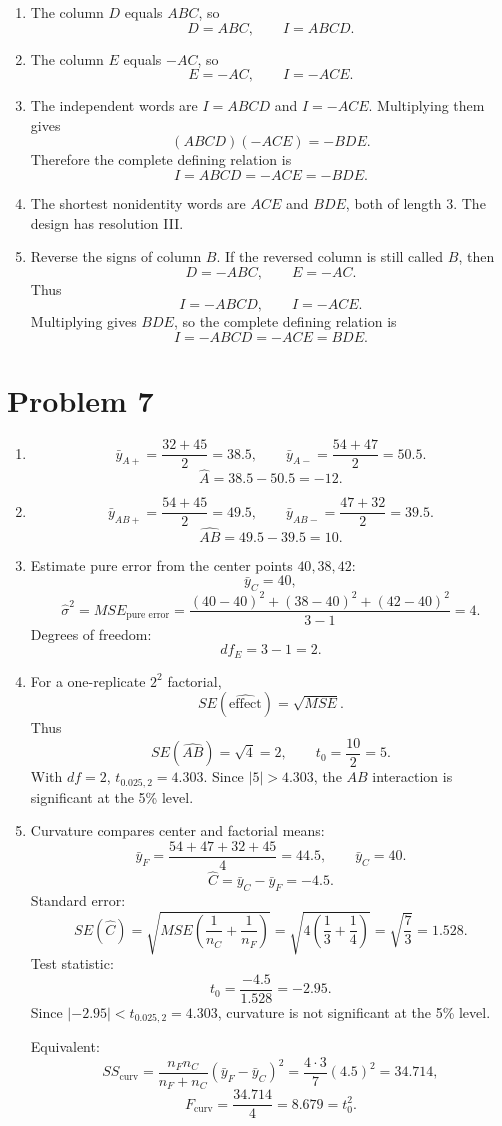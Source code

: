 \documentclass[11pt]{article}
\begin{document}
\begin{enumerate}[label=(\alph*)]
\item The column \(D\) equals \(ABC\), so
\[
D=ABC,\qquad I=ABCD.
\]

\item The column \(E\) equals \(-AC\), so
\[
E=-AC,\qquad I=-ACE.
\]

\item The independent words are \(I=ABCD\) and \(I=-ACE\). Multiplying them gives
\[
(ABCD)(-ACE)=-BDE.
\]
Therefore the complete defining relation is
\[
I=ABCD=-ACE=-BDE.
\]

\item The shortest nonidentity words are \(ACE\) and \(BDE\), both of length 3. The design has resolution III.

\item Reverse the signs of column \(B\). If the reversed column is still called \(B\), then
\[
D=-ABC,\qquad E=-AC.
\]
Thus
\[
I=-ABCD,\qquad I=-ACE.
\]
Multiplying gives \(BDE\), so the complete defining relation is
\[
I=-ABCD=-ACE=BDE.
\]
\end{enumerate}

\section*{Problem 7}

\begin{enumerate}[label=(\alph*)]
\item
\[
\bar y_{A+}=\frac{32+45}{2}=38.5,\qquad
\bar y_{A-}=\frac{54+47}{2}=50.5.
\]
\[
\hat A=38.5-50.5=-12.
\]

\item
\[
\bar y_{AB+}=\frac{54+45}{2}=49.5,\qquad
\bar y_{AB-}=\frac{47+32}{2}=39.5.
\]
\[
\widehat{AB}=49.5-39.5=10.
\]

\item Estimate pure error from the center points \(40,38,42\):
\[
\bar y_C=40,
\]
\[
\hat\sigma^2=MSE_{\text{pure error}}
=\frac{(40-40)^2+(38-40)^2+(42-40)^2}{3-1}
=4.
\]
Degrees of freedom:
\[
df_E=3-1=2.
\]

\item For a one-replicate \(2^2\) factorial,
\[
SE(\widehat{\text{effect}})=\sqrt{MSE}.
\]
Thus
\[
SE(\widehat{AB})=\sqrt{4}=2,\qquad
t_0=\frac{10}{2}=5.
\]
With \(df=2\), \(t_{0.025,2}=4.303\). Since \(|5|>4.303\), the \(AB\) interaction is significant at the 5\% level.

\item Curvature compares center and factorial means:
\[
\bar y_F=\frac{54+47+32+45}{4}=44.5,\qquad
\bar y_C=40.
\]
\[
\hat C=\bar y_C-\bar y_F=-4.5.
\]
Standard error:
\[
SE(\hat C)=\sqrt{MSE\left(\frac{1}{n_C}+\frac{1}{n_F}\right)}
=\sqrt{4\left(\frac{1}{3}+\frac{1}{4}\right)}
=\sqrt{\frac{7}{3}}=1.528.
\]
Test statistic:
\[
t_0=\frac{-4.5}{1.528}=-2.95.
\]
Since \(|-2.95|<t_{0.025,2}=4.303\), curvature is not significant at the 5\% level.

Equivalent:
\[
SS_{\text{curv}}=\frac{n_Fn_C}{n_F+n_C}(\bar y_F-\bar y_C)^2
=\frac{4\cdot3}{7}(4.5)^2=34.714,
\]
\[
F_{\text{curv}}=\frac{34.714}{4}=8.679=t_0^2.
\]
\end{enumerate}
\end{document}
